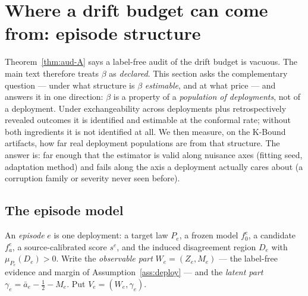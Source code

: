 %
%

\providecommand{\Var}{\operatorname{Var}}
\providecommand{\E}{\mathbb{E}}
\providecommand{\Law}{\mathcal{L}}
\providecommand{\sign}{\operatorname{sign}}
\providecommand{\TV}{\mathrm{TV}}
\providecommand{\KL}{\mathrm{KL}}
\providecommand{\R}{\mathbb{R}}

\section{Where a drift budget can come from: episode structure}
\label{app:episode-beta}

Theorem~\ref{thm:aud-A} says a label-free audit of the drift budget is vacuous. The main text
therefore treats $\beta$ as \emph{declared}. This section asks the complementary question --- under
what structure is $\beta$ \emph{estimable}, and at what price --- and answers it in one direction:
$\beta$ is a property of a \emph{population of deployments}, not of a deployment. Under
exchangeability across deployments plus retrospectively revealed outcomes it is identified and
estimable at the conformal rate; without both ingredients it is not identified at all. We then
measure, on the K-Bound artifacts, how far real deployment populations are from that structure. The
answer is: far enough that the estimator is valid along nuisance axes (fitting seed, adaptation
method) and fails along the axis a deployment actually cares about (a corruption family or severity
never seen before).

\subsection{The episode model}

\begin{definition}\label{epi:def-episode}
An \emph{episode} $e$ is one deployment: a target law $P_e$, a frozen model $f_0^e$, a candidate
$f_a^e$, a source-calibrated score $s^e$, and the induced disagreement region $D_e$ with
$\mu_{P_e}(D_e)>0$. Write the \emph{observable part}
$W_e=(Z_e,M_e)$ --- the label-free evidence and margin of Assumption~\ref{ass:deploy} --- and the
\emph{latent part} $\gamma_e=\bar a_e-\tfrac12-M_e$. Put $V_e=(W_e,\gamma_e)$.
\end{definition}

